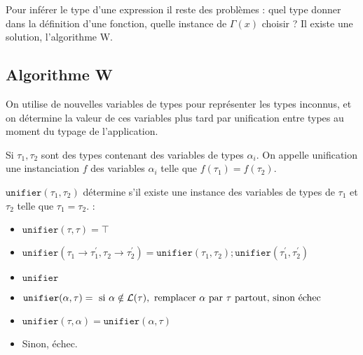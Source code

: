 \documentclass{cours}
\begin{document}
Pour inférer le type d'une expression il reste des problèmes : quel type donner dans la définition d'une fonction, quelle instance de $\Gamma(x)$ choisir ? Il existe une solution, l'algorithme W.
\subsection{Algorithme W}
On utilise de nouvelles variables de types pour représenter les types inconnus, et on détermine la valeur de ces variables plus tard par unification entre types au moment du typage de l'application.
\begin{definition}
    Si $\tau_{1}, \tau_{2}$ sont des types contenant des variables de types $\alpha_{i}$. On appelle unification une instanciation $f$ des variables $\alpha_{i}$ telle que $f(\tau_{1}) = f(\tau_{2})$.
\end{definition}

\begin{definition}
    $\texttt{unifier}(\tau_{1}, \tau_{2})$ détermine s'il existe une instance des variables de types de $\tau_{1}$ et $\tau_{2}$ telle que $\tau_{1} = \tau_{2}$. :
    \begin{itemize}
        \item $\texttt{unifier}(\tau, \tau) = \top$
        \item $\texttt{unifier}(\tau_{1} \rightarrow \tau_{1}^{'}, \tau_{2} \rightarrow \tau_{2}^{'}) = \texttt{unifier}(\tau_{1}, \tau_{2}); \texttt{unifier}(\tau_{1}^{'}, \tau_{2}^{'})$
        \item $\texttt{unifier}$
        \item $\texttt{unifier}(\alpha, \tau) = \text{ si } \alpha \notin \mathcal{L}(\tau), \text{ remplacer } \alpha \text{ par } \tau \text{ partout, sinon échec}$
        \item $\texttt{unifier}(\tau, \alpha) = \texttt{unifier}(\alpha, \tau)$
        \item Sinon, échec.
    \end{itemize}
\end{definition}
\end{document}
